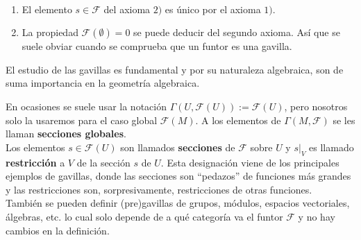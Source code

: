 \begin{remark}$ $
\begin{enumerate}
        \item El elemento $s\in \mathscr{F}$ del axioma $2)$ es único por el axioma $1)$. 
        \item La propiedad $\mathscr{F}(\emptyset)=0$ se puede deducir del segundo axioma. Así que se suele obviar cuando se comprueba que un funtor es una gavilla.
    \end{enumerate}
\end{remark}

El estudio de las gavillas es fundamental y por su naturaleza algebraica, son de suma importancia en la geometría algebraica.
\begin{remark}
    En ocasiones se suele usar la notación $\Gamma(U,\mathscr{F}(U)):=\mathscr{F}(U)$, pero nosotros solo la usaremos para el caso global $\mathscr{F}(M)$. A los elementos de $\Gamma(M,\mathscr{F})$ se les llaman \textbf{secciones globales}.\\
    Los elementos $s\in\mathscr{F}(U)$ son llamados \textbf{secciones} de $\mathscr{F}$ sobre $U$ y $s\left.\right|_V$ es llamado \textbf{restricción} a $V$ de la sección $s$ de $U$. Esta designación viene de los principales ejemplos de gavillas, donde las secciones son \enquote{pedazos} de funciones más grandes y las restricciones son, sorpresivamente, restricciones de otras funciones.\\
    También se pueden definir (pre)gavillas de grupos, módulos, espacios vectoriales, álgebras, etc. lo cual solo depende de a qué categoría va el funtor $\mathscr{F}$ y no hay cambios en la definición.
\end{remark}
    
